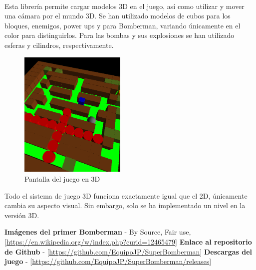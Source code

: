 \documentclass[a4paper]{article}
\begin{document}
\paragraph{}Esta librería permite cargar modelos 3D en el juego, así como utilizar y mover una cámara por el mundo 3D. Se han utilizado modelos de cubos para los bloques, enemigos, power ups y para Bomberman, variando únicamente en el color para distinguirlos. Para las bombas y sus explosiones se han utilizado esferas y cilindros, respectivamente.
\begin{figure}[H]
	\centering
	\includegraphics[width=2in]{bombermantresdes.png}
	\caption{Pantalla del juego en 3D}
	\label{fig:tresdes}
\end{figure}
Todo el sistema de juego 3D funciona exactamente igual que el 2D, únicamente cambia su aspecto visual. Sin embargo, solo se ha implementado un nivel en la versión 3D.
\newpage
\begin{thebibliography}{99}
	 \textbf{Imágenes del primer Bomberman} - By Source, Fair use, [\url{https://en.wikipedia.org/w/index.php?curid=12465479}]
	\bibitem{} \textbf{Enlace al repositorio de Github} - [\url{https://github.com/EquipoJP/SuperBomberman}]
	\bibitem{} \textbf{Descargas del juego} - [\url{https://github.com/EquipoJP/SuperBomberman/releases}]
	

\end{thebibliography}
\end{document}
